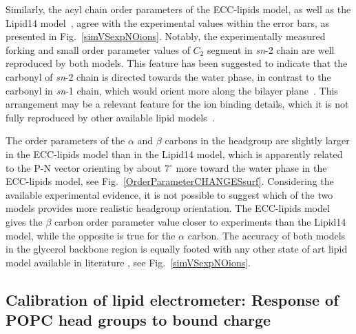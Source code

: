 \documentclass[aip,jcp,twocolumn]{revtex4}
\begin{document}
Similarly, the acyl chain order parameters of the ECC-lipids model, as well as the Lipid14 model~\cite{dickson14}, agree with the experimental values within the error bars, as presented in Fig.~\ref{simVSexpNOions}. Notably, the experimentally measured forking and small order parameter values of $C_2$ segment in {\it sn}-2 chain are well reproduced by both models. This feature has been suggested to indicate that the carbonyl of {\it sn}-2 chain is directed towards the water phase, in contrast to the carbonyl in {\it sn}-1 chain, which would orient more along the bilayer plane~\cite{seelig75,schindler75,gawrisch92}. This arrangement may be a relevant feature for the ion binding details, which it is not fully reproduced by other available lipid models~\cite{ollila16}.

The order parameters of the $\alpha$ and $\beta$ carbons in the headgroup are slightly larger in the ECC-lipids model than in the Lipid14 model, which is apparently related to the P-N vector orienting by about 7$^{\circ}$ more toward the water phase in the ECC-lipids model, see Fig.~\ref{OrderParameterCHANGESsurf}. Considering the available experimental evidence, it is not possible to suggest which of the two models provides more realistic headgroup orientation. The ECC-lipids model gives the $\beta$ carbon order parameter value closer to experiments than the Lipid14 model, while the opposite is true for the $\alpha$ carbon. The accuracy of both models in the glycerol backbone region is equally footed with any other state of art lipid model available in literature \cite{botan15}, see Fig.~\ref{simVSexpNOions}.



\subsection{Calibration of lipid electrometer:
            Response of POPC head groups to bound charge}\label{section:boundCHARGE}
\end{document}
